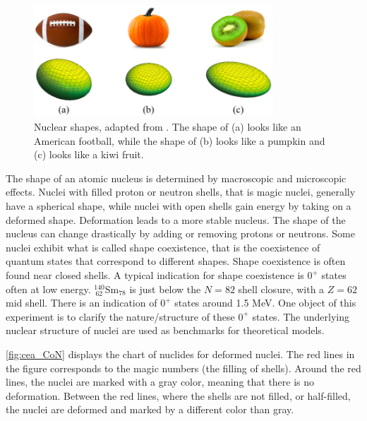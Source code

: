 \documentclass[twoside,english]{uiofysmaster/uiofysmaster}
\let\orgautoref\autoref
\renewcommand{\autoref}
        {%
		 \def\sectionautorefname{Section}%
		 \def\subsectionautorefname{Section}%
		 \def\subsubsectionautorefname{Section}%
		 \def\chapterautorefname{Chapter}%
          \orgautoref}
\begin{document}
\begin{figure}[htb]
	\centering
	\includegraphics[width=0.8\textwidth]{Images/nuclear-shapes-v2.png}
	\caption{Nuclear shapes, adapted from \cite{MSU-shapes}. 
	The shape of (a) looks like an American football, while the shape of (b) looks like a pumpkin and (c) looks like a kiwi fruit.}
	\label{fig:Nuclear-shapes}
\end{figure}

The shape of an atomic nucleus is determined by macroscopic and microscopic effects. 
Nuclei with filled proton or neutron shells, that is magic nuclei, generally have a spherical shape, while nuclei with open shells gain energy by taking on a deformed shape.
Deformation leads to a more stable nucleus.
The shape of the nucleus can change drastically by adding or removing protons or neutrons.
Some nuclei exhibit what is called shape coexistence, that is the coexistence of quantum states that correspond to different shapes.
Shape coexistence is often found near closed shells. 
A typical indication for shape coexistence is $0^+$ states often at low energy. 
$^{140}_{~62}$Sm$_{78}$ is just below the $N = 82$ shell closure, with a $Z = 62$ mid shell. 
There is an indication of $0^+$ states around 1.5 MeV. 
One object of this experiment is to clarify the nature/structure of these $0^+$ states. 
The underlying nuclear structure of nuclei are used as benchmarks for theoretical models.

\autoref{fig:cea_CoN} displays the chart of nuclides for deformed nuclei. 
The red lines in the figure corresponds to the magic numbers (the filling of shells). 
Around the red lines, the nuclei are marked with a gray color, meaning that there is no deformation. 
Between the red lines, where the shells are not filled, or half-filled, the nuclei are deformed and marked by a different color than gray. 
\end{document}
